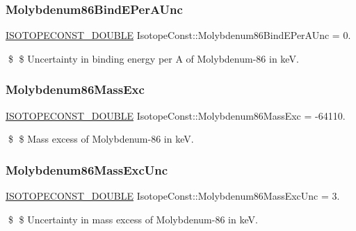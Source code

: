 \subsubsection{\texorpdfstring{Molybdenum86\+Bind\+E\+Per\+A\+Unc}{Molybdenum86BindEPerAUnc}}
{\footnotesize\ttfamily \mbox{\hyperlink{group___isotope_const-_macros_ga8f45a7272ce02c0b4c65c44636ed719a}{I\+S\+O\+T\+O\+P\+E\+C\+O\+N\+S\+T\+\_\+\+D\+O\+U\+B\+LE}} Isotope\+Const\+::\+Molybdenum86\+Bind\+E\+Per\+A\+Unc = 0.}

\$ \$ Uncertainty in binding energy per A of Molybdenum-\/86 in keV. \mbox{\label{group___isotope_const-_molybdenum-_mo86_ga1c8fe15e4e35bae9b8a0f8777c9a483c}} 
\subsubsection{\texorpdfstring{Molybdenum86\+Mass\+Exc}{Molybdenum86MassExc}}
{\footnotesize\ttfamily \mbox{\hyperlink{group___isotope_const-_macros_ga8f45a7272ce02c0b4c65c44636ed719a}{I\+S\+O\+T\+O\+P\+E\+C\+O\+N\+S\+T\+\_\+\+D\+O\+U\+B\+LE}} Isotope\+Const\+::\+Molybdenum86\+Mass\+Exc = -\/64110.}

\$ \$ Mass excess of Molybdenum-\/86 in keV. \mbox{\label{group___isotope_const-_molybdenum-_mo86_ga82399c6149539fa0a99d6f9e80849428}} 
\subsubsection{\texorpdfstring{Molybdenum86\+Mass\+Exc\+Unc}{Molybdenum86MassExcUnc}}
{\footnotesize\ttfamily \mbox{\hyperlink{group___isotope_const-_macros_ga8f45a7272ce02c0b4c65c44636ed719a}{I\+S\+O\+T\+O\+P\+E\+C\+O\+N\+S\+T\+\_\+\+D\+O\+U\+B\+LE}} Isotope\+Const\+::\+Molybdenum86\+Mass\+Exc\+Unc = 3.}

\$ \$ Uncertainty in mass excess of Molybdenum-\/86 in keV. \mbox{\label{group___isotope_const-_molybdenum-_mo86_ga04bfe5e65e5769578f8767c649133843}} 
